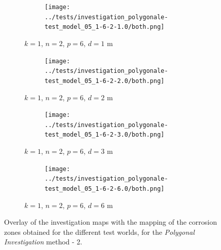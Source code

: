 \documentclass[english,RandD]{rapportPFE}  %
\begin{document}
		\begin{figure}[H]
			\centering
			\begin{subfigure}[t]{\linewidth}
				\centering
				\begin{subfigure}[t]{0.2\linewidth}
					\texttt{[image: ../tests/investigation\_polygonale-test\_model\_05\_1-6-2-1.0/both.png]}
				\end{subfigure}
				\caption{$k = 1$, $n = 2$, $p = 6$, $d = 1$ m}
			\end{subfigure}
			\hfill
			\begin{subfigure}[t]{\linewidth}
				\centering
				\begin{subfigure}[t]{0.2\linewidth}
					\texttt{[image: ../tests/investigation\_polygonale-test\_model\_05\_1-6-2-2.0/both.png]}
				\end{subfigure}
				\caption{$k = 1$, $n = 2$, $p = 6$, $d = 2$ m}
			\end{subfigure}
			\hfill
			\begin{subfigure}[t]{\linewidth}
				\centering
				\begin{subfigure}[t]{0.2\linewidth}
					\texttt{[image: ../tests/investigation\_polygonale-test\_model\_05\_1-6-2-3.0/both.png]}
				\end{subfigure}
				\caption{$k = 1$, $n = 2$, $p = 6$, $d = 3$ m}
			\end{subfigure}
			\hfill
			\begin{subfigure}[t]{\linewidth}
				\centering
				\begin{subfigure}[t]{0.2\linewidth}
					\texttt{[image: ../tests/investigation\_polygonale-test\_model\_05\_1-6-2-6.0/both.png]}
				\end{subfigure}
				\caption{$k = 1$, $n = 2$, $p = 6$, $d = 6$ m}
			\end{subfigure}
			\caption{Overlay of the investigation maps with the mapping of the corrosion zones obtained for the different test worlds, for the \textit{Polygonal Investigation} method - 2.}
			\label{fig:investigation_polygonale_resultats_2}
		\end{figure}
\end{document}
